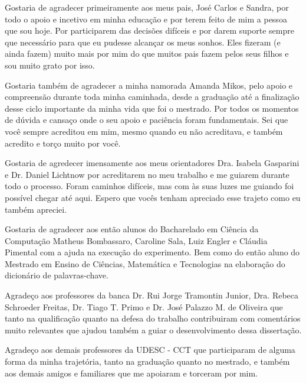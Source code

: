 

\begin{agradecimentos}
Gostaria de agradecer primeiramente aos meus pais, José Carlos e Sandra, por todo o apoio e incetivo em minha educação
e por terem feito de mim a pessoa que sou hoje. Por participarem das decisões difíceis e por darem suporte sempre que
necessário para que eu pudesse alcançar os meus sonhos. Eles fizeram (e ainda fazem) muito mais por mim do que muitos
pais fazem pelos seus filhos e sou muito grato por isso.

Gostaria também de agradecer a minha namorada Amanda Mikos, pelo apoio e compreensão durante toda minha caminhada, desde
a graduação até a finalização desse ciclo importante da minha vida que foi o mestrado. Por todos os momentos de dúvida
e cansaço onde o seu apoio e paciência foram fundamentais. Sei que você sempre acreditou em mim, mesmo quando eu não acreditava,
e também acredito e torço muito por você.

Gostaria de agredecer imensamente aos meus orientadores Dra. Isabela Gasparini e Dr. Daniel Lichtnow por acreditarem no
meu trabalho e me guiarem durante todo o processo. Foram caminhos difíceis, mas com às suas luzes me guiando foi possível
chegar até aqui. Espero que vocês tenham apreciado esse trajeto como eu também apreciei.

Gostaria de agradecer aos então alunos do Bacharelado em Ciência da Computação Matheus Bombassaro, Caroline Sala, Luiz Engler
e Cláudia Pimental com a ajuda na execução do experimento. Bem como do então aluno do Mestrado em Ensino de Ciências,
Matemática e Tecnologias na elaboração do dicionário de palavras-chave.

Agradeço aos professores da banca Dr. Rui Jorge Tramontin Junior, Dra. Rebeca Schroeder Freitas, Dr. Tiago T. Primo e
Dr. José Palazzo M. de Oliveira que tanto na qualificação quanto na defesa do trabalho contribuiram com comentários muito
relevantes que ajudou também a guiar o desenvolvimento dessa dissertação.

Agradeço aos demais professores da UDESC - CCT que participaram de alguma forma da minha trajetória, tanto na graduação
quanto no mestrado, e também aos demais amigos e familiares que me apoiaram e torceram por mim.
\end{agradecimentos}

